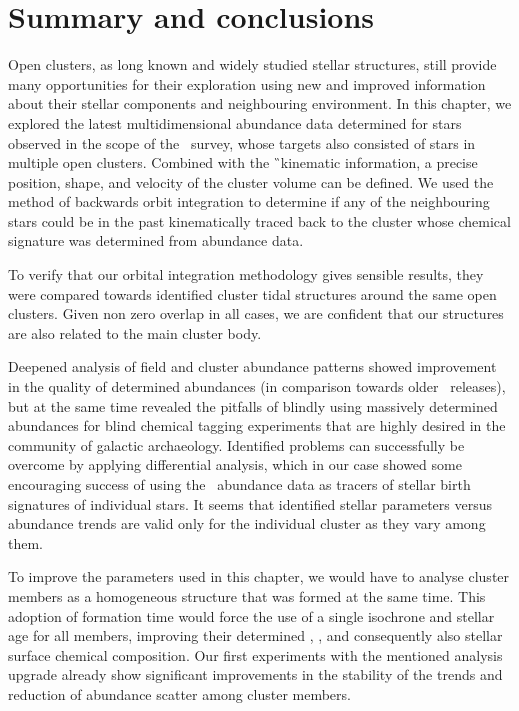 \section{Summary and conclusions}
\label{sec:clusters_summary_conclusions}
Open clusters, as long known and widely studied stellar structures, still provide many opportunities for their exploration using new and improved information about their stellar components and neighbouring environment. In this chapter, we explored the latest multidimensional abundance data determined for stars observed in the scope of the \Gh\ survey, whose targets also consisted of stars in multiple open clusters. Combined with the \G\ kinematic information, a precise position, shape, and velocity of the cluster volume can be defined. We used the method of backwards orbit integration to determine if any of the neighbouring stars could be in the past kinematically traced back to the cluster whose chemical signature was determined from abundance data.

To verify that our orbital integration methodology gives sensible results, they were compared towards identified cluster tidal structures around the same open clusters. Given non zero overlap in all cases, we are confident that our structures are also related to the main cluster body.

Deepened analysis of field and cluster abundance patterns showed improvement in the quality of determined abundances (in comparison towards older \Gh\ releases), but at the same time revealed the pitfalls of blindly using massively determined abundances for blind chemical tagging experiments that are highly desired in the community of galactic archaeology. Identified problems can successfully be overcome by applying differential analysis, which in our case showed some encouraging success of using the \Gh\ abundance data as tracers of stellar birth signatures of individual stars. It seems that identified stellar parameters versus abundance trends are valid only for the individual cluster as they vary among them.

To improve the parameters used in this chapter, we would have to analyse cluster members as a homogeneous structure that was formed at the same time. This adoption of formation time would force the use of a single isochrone and stellar age for all members, improving their determined \Logg, \Feh, and consequently also stellar surface chemical composition. Our first experiments with the mentioned analysis upgrade already show significant improvements in the stability of the trends and reduction of abundance scatter among cluster members.

